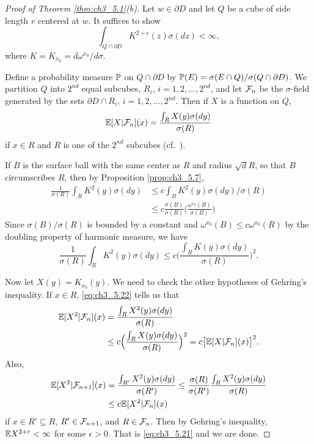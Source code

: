 \begin{proof}[Proof of Theorem \ref{thm:ch3_5.1}(b)]
Let $w \in \partial D$ and let $Q$ be a cube of side length $r$ centered at $w$. It suffices to show
\begin{equation}\label{eq:ch3_5.21}
    \int_{Q\cap\partial D} K^{2+\epsilon}(z)\sigma(dz) < \infty,
\end{equation}
where $K = K_{x_0} = d\omega^{x_0}/d\sigma$.

\mpagebreak

Define a probability measure $\P$ on $Q \cap \partial D$ by $\P(E) = \sigma(E \cap Q)/\sigma(Q \cap \partial D)$. We partition $Q$ into $2^{nd}$ equal subcubes, $R_i$, $i = 1,2,\ldots,2^{nd}$, and let $\FC_n$ be the $\sigma$-field generated by the sets $\partial D \cap R_i$, $i = 1,2,\ldots,2^{nd}$. Then if $X$ is a function on $Q$,
\[
    \E[X\mid \FC_n](x) = \frac{\int_R X(y)\sigma(dy)}{\sigma(R)}
\]
if $x \in R$ and $R$ is one of the $2^{nd}$ subcubes (cf.\ ).

If $B$ is the surface ball with the same center as $R$ and radius $\sqrt{d}R$, so that $B$ circumscribes $R$, then by Proposition \ref{prop:ch3_5.7},
\begin{align*}
    \frac{1}{\sigma(R)} \int_R K^2(y)\sigma(dy) &\leq c\int_B K^2(y)\sigma(dy)/\sigma(R) \\
    &\leq c\frac{\sigma(B)}{\sigma(R)}\Big(\frac{\omega^{x_0}(B)}{\sigma(B)}\Big)
\end{align*}
Since $\sigma(B)/\sigma(R)$ is bounded by a constant and $\omega^{x_0}(B) \leq c\omega^{x_0}(R)$ by the doubling property of harmonic measure, we have
\begin{equation}\label{eq:ch3_5.22}
    \frac{1}{\sigma(R)} \int_R K^2(y)\sigma(dy) \leq c\Big(\frac{\int_R K(y)\sigma(dy)}{\sigma(R)}\Big)^2.
\end{equation}

Now let $X(y) = K_{x_0}(y)$. We need to check the other hypotheses of Gehring's inequality. If $x \in R$, \eqref{eq:ch3_5.22} tells us that
\begin{align}\label{eq:ch3_5.23}
    \E[X^2\mid \FC_n](x) &= \frac{\int_R X^2(y)\sigma(dy)}{\sigma(R)} \\
    &\leq c\Big(\frac{\int_R X(y)\sigma(dy)}{\sigma(R)}\Big)^2 = c\big[\E[X\mid \FC_n](x)\big]^2. \notag
\end{align}
Also,
\begin{align*}
    \E[X^2\mid \FC_{n+1}](x) &= \frac{\int_{R'} X^2(y)\sigma(dy)}{\sigma(R')} \leq \frac{\sigma(R)}{\sigma(R')} \frac{\int_R X^2(y)\sigma(dy)}{\sigma(R)} \\
    &\leq c\E[X^2\mid \FC_n](x)
\end{align*}
if $x \in R' \subseteq R$, $R' \in \FC_{n+1}$, and $R \in \FC_n$. Then by Gehring's inequality, $\E X^{2+\epsilon} < \infty$ for some $\epsilon > 0$. That is \eqref{eq:ch3_5.21} and we are done.
\end{proof}

